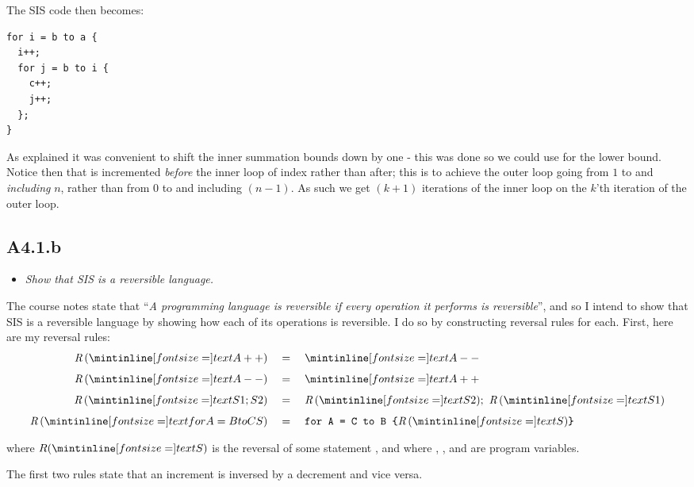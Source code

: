 \newpage

The SIS code then becomes:

\begin{verbatim}
for i = b to a {
  i++;
  for j = b to i {
    c++;
    j++;
  };
}
\end{verbatim}

As explained it was convenient to shift the inner summation bounds down by one -
this was done so we could use  for the lower bound. Notice then that
 is incremented \emph{before} the inner loop of index  rather than
after; this is to achieve the outer loop going from $1$ to and \emph{including}
$n$, rather than from $0$ to and including $(n - 1)$. As such we get $(k + 1)$
iterations of the inner loop on the $k$'th iteration of the outer loop.

\sectend

\subsection{A4.1.b}

\begin{itemize}
  \item \emph{Show that SIS is a reversible language.}
\end{itemize}

The course notes state that ``\emph{A programming language is reversible if
every operation it performs is reversible}'', and so I intend to show that SIS
is a reversible language by showing how each of its operations is reversible. I
do so by constructing reversal rules for each. First, here are my reversal
rules:
\begin{align*}
  \textit{R}\, (\ms{A++})    \quad &= \quad \ms{A--}\\[4pt]
  \textit{R}\, (\ms{A--})    \quad &= \quad \ms{A++}\\[4pt]
  \textit{R}\, (\ms{S1; S2}) \quad &=
      \quad \textit{R}\, (\ms{S2}) ;\ \textit{R}\, (\ms{S1})\\[4pt]
  \textit{R}\, (\ms{for A = B to C { S }}) \quad &=
      \quad \texttt{for A = C to B \{}\textit{R}\, (\ms{S})\texttt{\}}
\end{align*}

where $R(\ms{S})$ is the reversal of some statement , and where ,
, and  are program variables.

\medskip

The first two rules state that an increment is inversed by a decrement and vice
versa.

